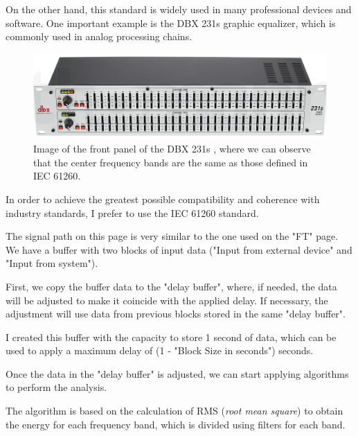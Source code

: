 On the other hand, this standard is widely used in many professional devices and software. One important example is the DBX 231s graphic equalizer, which is commonly used in analog processing chains.

\begin{figure}[H]
	\centering
	\includegraphics[width=1
	\linewidth]{Figures/DBX_231s.png}
	\caption{Image of the front panel of the DBX 231s \cite{DBX_31s}, where we can observe that the center frequency bands are the same as those defined in IEC 61260.}
	\label{fig:DBX_31s}
\end{figure}

In order to achieve the greatest possible compatibility and coherence with industry standards, I prefer to use the IEC 61260 standard.


The signal path on this page is very similar to the one used on the "FT" page. We have a buffer with two blocks of input data ("Input from external device" and "Input from system").

First, we copy the buffer data to the "delay buffer", where, if needed, the data will be adjusted to make it coincide with the applied delay. If necessary, the adjustment will use data from previous blocks stored in the same "delay buffer".

I created this buffer with the capacity to store 1 second of data, which can be used to apply a maximum delay of (1 - "Block Size in seconds") seconds.

Once the data in the "delay buffer" is adjusted, we can start applying algorithms to perform the analysis.

The algorithm is based on the calculation of RMS (\textit{root mean square}) to obtain the energy for each frequency band, which is divided using filters for each band.


